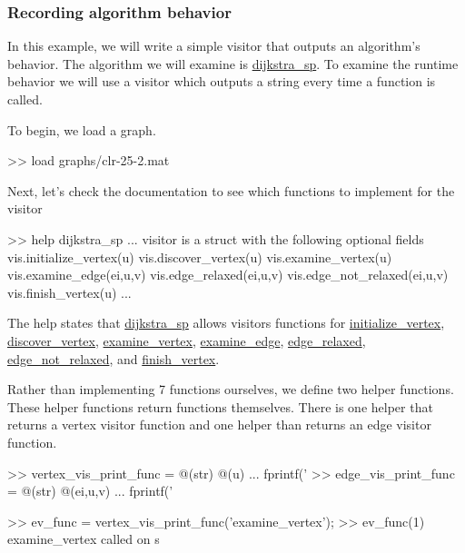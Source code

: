 \documentclass[12pt]{article}
\newcommand{\mycmd}[1]{\url{#1}}
\begin{document}
\subsubsection*{Recording algorithm behavior}

 In this example, we will write a simple visitor that outputs an
 algorithm's behavior.  The algorithm we will examine is \mycmd{dijkstra_sp}.  To
 examine the runtime behavior we will use a visitor which outputs a string
 every time a function is called.


 To begin, we load a graph.

\begin{mcode}
>> load graphs/clr-25-2.mat
\end{mcode}

 Next, let's check the documentation to see which functions to implement 
 for the visitor

\begin{mcode}
>> help dijkstra_sp
...
  visitor is a struct with the following optional fields
     vis.initialize_vertex(u)
     vis.discover_vertex(u)
     vis.examine_vertex(u)
     vis.examine_edge(ei,u,v)
     vis.edge_relaxed(ei,u,v)
     vis.edge_not_relaxed(ei,u,v)
     vis.finish_vertex(u)
...     
\end{mcode}

 The help states that \mycmd{dijkstra_sp} allows visitors functions for
 \mycmd{initialize_vertex}, \mycmd{discover_vertex}, \mycmd{examine_vertex}, \mycmd{examine_edge},
 \mycmd{edge_relaxed}, \mycmd{edge_not_relaxed}, and \mycmd{finish_vertex}.

 Rather than implementing 7 functions ourselves, we define two helper
 functions.  These helper functions return functions themselves.  There is
 one helper that returns a vertex visitor function and one helper than
 returns an edge visitor function.

\begin{mcode}
>> vertex_vis_print_func = @(str) @(u) ...
      fprintf('%
>> edge_vis_print_func = @(str) @(ei,u,v) ...
      fprintf('%
\end{mcode}


\begin{mcode}
>> ev_func = vertex_vis_print_func('examine_vertex');
>> ev_func(1)
examine_vertex called on s
\end{mcode}
\end{document}
